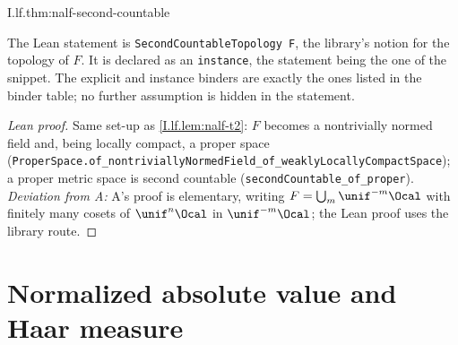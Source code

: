 \begin{theorem}
\end{theorem}
\begin{tfformal}{I.lf.thm:nalf-second-countable}
\begin{tffidelity}
The Lean statement is \texttt{SecondCountableTopology F}, the library's notion for the topology of $F$. It is declared as an \texttt{instance}, the statement being the one of the snippet. The explicit and instance binders are exactly the ones listed in the binder table; no further assumption is hidden in the statement.
\end{tffidelity}
\end{tfformal}
\begin{proof}[Lean proof]
Same set-up as \cref{I.lf.lem:nalf-t2}: $F$ becomes a nontrivially normed field and, being locally compact, a proper space (\texttt{ProperSpace.of\_nontriviallyNormedField\_of\_weaklyLocallyCompactSpace}); a proper metric space is second countable (\texttt{secondCountable\_of\_proper}). \emph{Deviation from A:} A's proof is elementary, writing $F=\bigcup_m\unif^{-m}\Ocal$ with finitely many cosets of $\unif^n\Ocal$ in $\unif^{-m}\Ocal$; the Lean proof uses the library route.
\end{proof}

\begin{tfoutline}
\end{tfoutline}

\section{Normalized absolute value and Haar measure}

